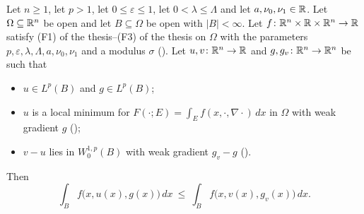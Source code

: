 \begin{lemma}
Let $n\ge1$, let $p>1$, let $0\le\varepsilon\le1$, let $0<\lambda\le\Lambda$
and let $a,\nu_0,\nu_1\in\mathbb{R}$.  Let $\Omega\subseteq\mathbb{R}^n$ be open and let
$B\subseteq\Omega$ be open with $|B|<\infty$.  Let
$f\colon\mathbb{R}^n\times\mathbb{R}\times\mathbb{R}^n\to\mathbb{R}$ satisfy
(F1) of the thesis--(F3) of the thesis on $\Omega$ with the parameters
$p,\varepsilon,\lambda,\Lambda,a,\nu_0,\nu_1$ and a modulus $\sigma$
().  Let
$u,v\colon\mathbb{R}^n\to\mathbb{R}$ and $g,g_v\colon\mathbb{R}^n\to\mathbb{R}^n$ be such that
\begin{itemize}
\item $u\in L^p(B)$ and $g\in L^p(B)$;
\item $u$ is a local minimum for $F(\cdot;E)=\int_Ef(x,\cdot,\nabla\cdot)\,dx$
  in $\Omega$ with weak gradient $g$ ();
\item $v-u$ lies in $W^{1,p}_0(B)$ with weak gradient $g_v-g$
  ().
\end{itemize}
Then
\[
\int_Bf\bigl(x,u(x),g(x)\bigr)\,dx\ \le\ \int_Bf\bigl(x,v(x),g_v(x)\bigr)\,dx .
\]
\end{lemma}
